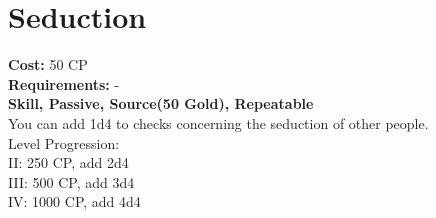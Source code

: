 \section{Seduction}
\textbf{Cost:} 50 CP\\
\textbf{Requirements:} -\\
\textbf{Skill, Passive, Source(50 Gold), Repeatable}\\
You can add 1d4 to checks concerning the seduction of other people.
\\
Level Progression:\\
II: 250 CP, add 2d4\\
III: 500 CP, add 3d4\\
IV: 1000 CP, add 4d4\\